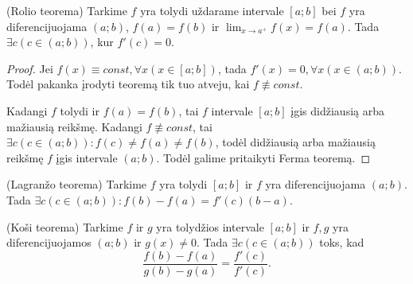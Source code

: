 \begin{prop}
  (Rolio teorema) Tarkime $f$ yra tolydi uždarame intervale $[a; b]$
  bei $f$ yra diferencijuojama $(a; b)$, $f(a) = f(b)$ ir 
  $\lim _{x \to a^{+}} f(x) = f(a)$. Tada 
  $\exists c (c \in (a; b))$, kur $f'(c) = 0$.

  \begin{proof}
    Jei $f(x) \equiv const, \forall x (x \in [a; b])$, tada 
    $f'(x) = 0, \forall x (x \in (a; b))$. Todėl pakanka įrodyti 
    teoremą tik tuo atveju, kai $f \not\equiv const$.

    Kadangi $f$ tolydi ir $f(a) = f(b)$, tai $f$ intervale
    $[a; b]$ įgis didžiausią arba mažiausią reikšmę. Kadangi
    $f \not\equiv const$, tai 
    $\exists c (c \in (a; b)) : f(c) \neq f(a) \neq f(b)$, todėl
    didžiausią arba mažiausią reikšmę $f$ įgis intervale $(a; b)$.
    Todėl galime pritaikyti Ferma teoremą.
  \end{proof}
\end{prop}

\begin{prop}
  \label{lagran_vid}
  (Lagranžo teorema) Tarkime $f$ yra tolydi $[a; b]$ ir $f$ yra 
  diferencijuojama $(a; b)$. Tada 
  $\exists c (c \in (a; b)) : f(b) - f(a) = f'(c)(b - a)$.
\end{prop}

\begin{prop}
  \label{kosi_vid}
  (Koši teorema) Tarkime $f$ ir $g$ yra tolydžios intervale $[a;b]$ ir
  $f, g$ yra diferencijuojamos $(a; b)$ ir $g(x) \neq 0$. Tada
  $\exists c (c \in (a; b))$ toks, kad
  \begin{equation*}
    \frac{f(b) - f(a)}{g(b) - g(a)} = \frac{f'(c)}{f'(c)}.
  \end{equation*}
\end{prop}
